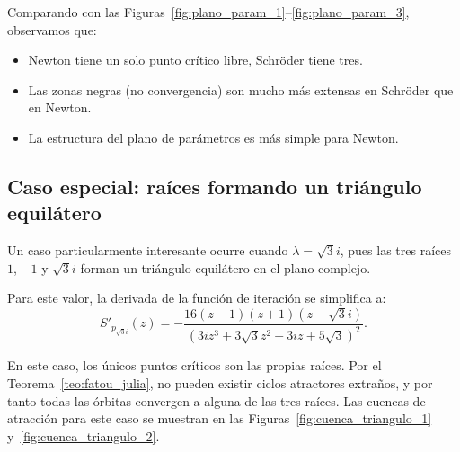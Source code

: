 Comparando con las Figuras~\ref{fig:plano_param_1}--\ref{fig:plano_param_3}, observamos que:
\begin{itemize}
\item Newton tiene un solo punto crítico libre, Schröder tiene tres.
\item Las zonas negras (no convergencia) son mucho más extensas en Schröder que en Newton.
\item La estructura del plano de parámetros es más simple para Newton.
\end{itemize}

\subsection{Caso especial: raíces formando un triángulo equilátero}

Un caso particularmente interesante ocurre cuando $\lambda=\sqrt{3}i$, pues las tres raíces $1$, $-1$ y $\sqrt{3}i$ forman un triángulo equilátero en el plano complejo.

Para este valor, la derivada de la función de iteración se simplifica a:
$$
S'_{p_{\sqrt{3}i}}(z)=-\frac{16(z-1)(z+1)(z-\sqrt{3}i)}{(3iz^3+3\sqrt{3}z^2-3iz+5\sqrt{3})^2}.
$$

En este caso, los únicos puntos críticos son las propias raíces. Por el Teorema~\ref{teo:fatou_julia}, no pueden existir ciclos atractores extraños, y por tanto todas las órbitas convergen a alguna de las tres raíces. Las cuencas de atracción para este caso se muestran en las Figuras~\ref{fig:cuenca_triangulo_1} y~\ref{fig:cuenca_triangulo_2}.

